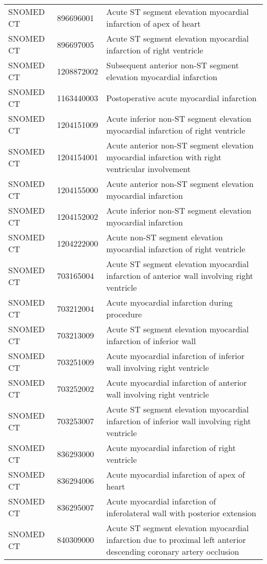 \begin{longtable}{p{}p{}p{}}
  SNOMED CT & 896696001 & Acute ST segment elevation myocardial infarction of apex of heart \\ 
  SNOMED CT & 896697005 & Acute ST segment elevation myocardial infarction of right ventricle \\ 
  SNOMED CT & 1208872002 & Subsequent anterior non-ST segment elevation myocardial infarction \\ 
  SNOMED CT & 1163440003 & Postoperative acute myocardial infarction \\ 
  SNOMED CT & 1204151009 & Acute inferior non-ST segment elevation myocardial infarction of right ventricle \\ 
  SNOMED CT & 1204154001 & Acute anterior non-ST segment elevation myocardial infarction with right ventricular involvement \\ 
  SNOMED CT & 1204155000 & Acute anterior non-ST segment elevation myocardial infarction \\ 
  SNOMED CT & 1204152002 & Acute inferior non-ST segment elevation myocardial infarction \\ 
  SNOMED CT & 1204222000 & Acute non-ST segment elevation myocardial infarction of right ventricle \\ 
  SNOMED CT & 703165004 & Acute ST segment elevation myocardial infarction of anterior wall involving right ventricle \\ 
  SNOMED CT & 703212004 & Acute myocardial infarction during procedure \\ 
  SNOMED CT & 703213009 & Acute ST segment elevation myocardial infarction of inferior wall \\ 
  SNOMED CT & 703251009 & Acute myocardial infarction of inferior wall involving right ventricle \\ 
  SNOMED CT & 703252002 & Acute myocardial infarction of anterior wall involving right ventricle \\ 
  SNOMED CT & 703253007 & Acute ST segment elevation myocardial infarction of inferior wall involving right ventricle \\ 
  SNOMED CT & 836293000 & Acute myocardial infarction of right ventricle \\ 
  SNOMED CT & 836294006 & Acute myocardial infarction of apex of heart \\ 
  SNOMED CT & 836295007 & Acute myocardial infarction of inferolateral wall with posterior extension \\ 
  SNOMED CT & 840309000 & Acute ST segment elevation myocardial infarction due to proximal left anterior descending coronary artery occlusion \\ 

\end{longtable}

